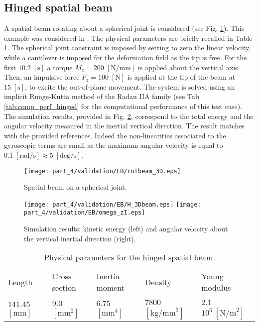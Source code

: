 \subsection{Hinged spatial beam}
A spatial beam rotating about a spherical joint is considered (see Fig. \ref{fig:beam_3D}). This example was considered in \cite{cardona2000,ellenbroek2018}. The physical parameters are briefly recalled in Table \ref{tab:data_3Dbeam}. The spherical joint constraint is imposed by setting to zero the linear velocity, while a cantilever is imposed for the deformation field as the tip is free. For the first $10.2 \; [\mathrm{s}]$ a torque $ M_z =200 \; [\mathrm{N/mm}]$ is applied about the vertical axis. Then, an impulsive force $ F_z =100 \; [\mathrm{N}]$ is applied at the tip of the beam at $15 \; [\mathrm{s}]$, to excite the out-of-plane movement. The system is solved using an implicit Runge-Kutta method of the Radau IIA family {(see Tab. \ref{tab:comp_perf_hinged} for the computational performance of this test case)}. The simulation results, provided in Fig. \ref{fig:H_omega}, correspond to the total energy and the angular velocity measured in the inertial vertical direction. The result matches with the provided references. Indeed the non-linearities associated to the gyroscopic terms are small as the maximum angular velocity is equal to $0.1 \; [\mathrm{rad/s}] \approx 5 \; [\mathrm{deg/s}]$. 

\begin{figure}[tb]
	\centering
	\texttt{[image: part\_4/validation/EB/rotbeam\_3D.eps]} 
	\caption{Spatial beam on a spherical joint.}
	\label{fig:beam_3D}
\end{figure}

\begin{figure}[tb]
	\centering
	\texttt{[image: part\_4/validation/EB/H\_3Dbeam.eps]} 
	\texttt{[image: part\_4/validation/EB/omega\_zI.eps]} 
	\caption{Simulation results: kinetic energy (left) and angular velocity about the vertical inertial direction (right).}
	\label{fig:H_omega}
\end{figure}

\begin{table}[tb]
	\centering
	\caption{Physical parameters for the hinged spatial beam.}
	\label{tab:data_3Dbeam}       %
	\begin{tabular}{lllll}
		\hline\noalign{\smallskip}
		Length & Cross section & Inertia moment & Density & Young modulus \\
		\noalign{\smallskip}\hline\noalign{\smallskip}
		141.45 $[\mathrm{mm}]$ & 9.0 $[\mathrm{mm}^2]$ & 6.75 $[\mathrm{mm}^4]$ & 7800 $[\mathrm{kg/mm}^3]$ & 2.1 $10^6 \ [\mathrm{N/m}^2]$  \\
		\hline
	\end{tabular}
\end{table}


